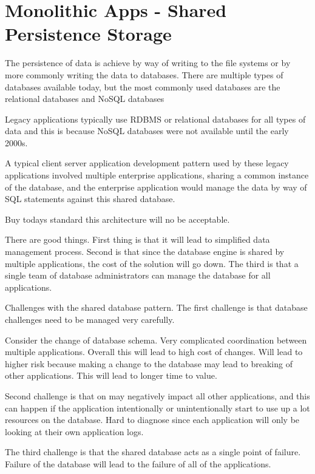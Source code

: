 \documentclass[a4paper, 11pt]{book}
\begin{document}
    \section{Monolithic Apps - Shared Persistence Storage}
    The persistence of data is achieve by way of writing to the file systems or by more commonly writing the data to databases.
    There are multiple types of databases available today, but the most commonly used databases are the relational databases and NoSQL databases

    Legacy applications typically use RDBMS or relational databases for all types of data and this is because NoSQL databases were not available until the early 2000s.

    A typical client server application development pattern used by these legacy applications involved multiple enterprise applications, sharing a common instance of the database,
    and the enterprise application would manage the data by way of SQL statements against this shared database.

    Buy todays standard this architecture will no be acceptable.

    There are good things.
    First thing is that it will lead to simplified data management process.
    Second is that since the database engine is shared by multiple applications, the cost of the solution will go down.
    The third is that a single team of database administrators can manage the database for all applications.

    Challenges with the shared database pattern.
    The first challenge is that database challenges need to be managed very carefully.

    Consider the change of database schema.
    Very complicated coordination between multiple applications.
    Overall this will lead to high cost of changes.
    Will lead to higher risk because making a change to the database may lead to breaking of other applications.
    This will lead to longer time to value.

    Second challenge is that on may negatively impact all other applications, and this can happen if the application intentionally or unintentionally start to use up a lot resources on the database.
    Hard to diagnose since each application will only be looking at their own application logs.

    The third challenge is that the shared database acts as a single point of failure.
    Failure of the database will lead to the failure of all of the applications.
\end{document}
